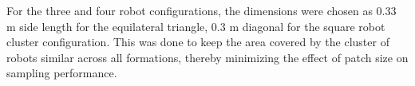 \documentclass[lettersize,journal]{IEEEtran}
\begin{document}
For the three and four robot configurations, the dimensions were chosen as 0.33 m side length for the equilateral triangle, 0.3 m diagonal for the square robot cluster configuration. This was done to keep the area covered by the cluster of robots similar across all formations, thereby minimizing the effect of patch size on sampling performance.

\end{document}
